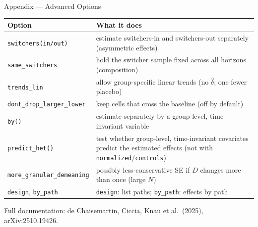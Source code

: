 \documentclass[main.tex]{subfiles}
\begin{document}
\begin{frame}[fragile]{Appendix --- Advanced Options}

  \footnotesize
  \begin{tabular}{@{}p{3.6cm}p{7.2cm}@{}}
    \toprule
    \textbf{Option} & \textbf{What it does} \\
    \midrule
    \texttt{switchers(in/out)} & estimate switchers-in and switchers-out separately (asymmetric effects) \\[3pt]
    \texttt{same\_switchers} & hold the switcher sample fixed across all horizons (composition) \\[3pt]
    \texttt{trends\_lin} & allow group-specific linear trends (no $\hat\delta$; one fewer placebo) \\[3pt]
    \texttt{dont\_drop\_larger\_lower} & keep cells that cross the baseline (off by default) \\[3pt]
    \texttt{by()} & estimate separately by a group-level, time-invariant variable \\[3pt]
    \texttt{predict\_het()} & test whether group-level, time-invariant covariates predict the estimated effects (not with \texttt{normalized}/\texttt{controls}) \\[3pt]
    \texttt{more\_granular\_demeaning} & possibly less-conservative SE if $D$ changes more than once (large $N$) \\[3pt]
    \texttt{design}, \texttt{by\_path} & \texttt{design}: list paths; \texttt{by\_path}: effects by path \\
    \bottomrule
  \end{tabular}

  \smallskip
  \footnotesize Full documentation: de Chaisemartin, Ciccia, Knau et al.\ (2025),
  arXiv:2510.19426.

\end{frame}
\end{document}
